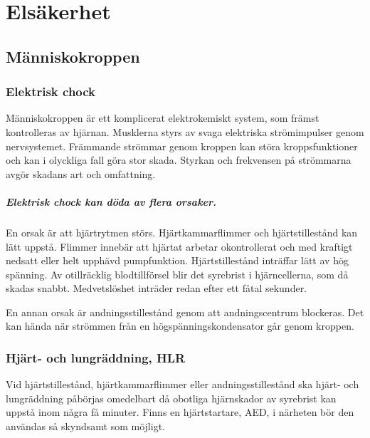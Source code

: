\chapter{Elsäkerhet}
\label{Elsäkerhet}

\section{Människokroppen}

\subsection{Elektrisk chock}

Människokroppen är ett komplicerat elektrokemiskt system, som främst
kontrolleras av hjärnan.
Musklerna styrs av svaga elektriska strömimpulser genom nervsystemet.
Främmande strömmar genom kroppen kan störa kroppsfunktioner och kan i olyckliga
fall göra stor skada.
Styrkan och frekvensen på strömmarna avgör skadans art och omfattning.

\paragraph{Elektrisk chock kan döda av flera orsaker.}
En orsak är att hjärtrytmen störs.
Hjärtkammarflimmer och hjärtstillestånd kan lätt uppstå.
Flimmer innebär att hjärtat arbetar okontrollerat och med kraftigt nedsatt
eller helt upphävd pumpfunktion.
Hjärtstillestånd inträffar lätt av hög spänning.
Av otillräcklig blodtillförsel blir det syrebrist i hjärncellerna, som då
skadas snabbt.
Medvetslöshet inträder redan efter ett fåtal sekunder.

En annan orsak är andningsstillestånd genom att andningscentrum blockeras.
Det kan hända när strömmen från en högspänningskondensator går genom kroppen.

\subsection{Hjärt- och lungräddning, HLR}

Vid hjärtstillestånd, hjärtkammarflimmer eller andningsstillestånd ska
hjärt- och lungräddning påbörjas omedelbart då obotliga hjärnskador av
syrebrist kan uppstå inom några få minuter.
Finns en hjärtstartare, AED, i närheten bör den användas så skyndsamt som
möjligt.


